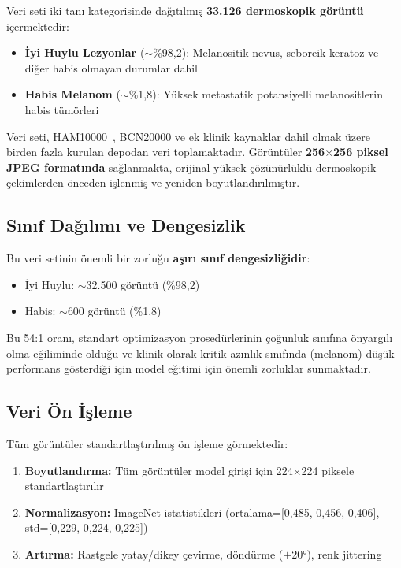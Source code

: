 \documentclass[12pt,a4paper]{article}
\begin{document}
Veri seti iki tanı kategorisinde dağıtılmış \textbf{33.126 dermoskopik görüntü} içermektedir:
\begin{itemize}
    \item \textbf{İyi Huylu Lezyonlar} ($\sim$\%98,2): Melanositik nevus, seboreik keratoz ve diğer habis olmayan durumlar dahil
    \item \textbf{Habis Melanom} ($\sim$\%1,8): Yüksek metastatik potansiyelli melanositlerin habis tümörleri
\end{itemize}

Veri seti, HAM10000~\cite{tschandl2018}, BCN20000 ve ek klinik kaynaklar dahil olmak üzere birden fazla kurulan depodan veri toplamaktadır. Görüntüler \textbf{256$\times$256 piksel JPEG formatında} sağlanmakta, orijinal yüksek çözünürlüklü dermoskopik çekimlerden önceden işlenmiş ve yeniden boyutlandırılmıştır.

\subsection{Sınıf Dağılımı ve Dengesizlik}

Bu veri setinin önemli bir zorluğu \textbf{aşırı sınıf dengesizliğidir}:
\begin{itemize}
    \item İyi Huylu: $\sim$32.500 görüntü (\%98,2)
    \item Habis: $\sim$600 görüntü (\%1,8)
\end{itemize}

Bu 54:1 oranı, standart optimizasyon prosedürlerinin çoğunluk sınıfına önyargılı olma eğiliminde olduğu ve klinik olarak kritik azınlık sınıfında (melanom) düşük performans gösterdiği için model eğitimi için önemli zorluklar sunmaktadır.

\subsection{Veri Ön İşleme}

Tüm görüntüler standartlaştırılmış ön işleme görmektedir:
\begin{enumerate}
    \item \textbf{Boyutlandırma:} Tüm görüntüler model girişi için 224$\times$224 piksele standartlaştırılır
    \item \textbf{Normalizasyon:} ImageNet istatistikleri (ortalama=[0,485, 0,456, 0,406], std=[0,229, 0,224, 0,225])
    \item \textbf{Artırma:} Rastgele yatay/dikey çevirme, döndürme ($\pm$20°), renk jittering
\end{enumerate}
\end{document}
